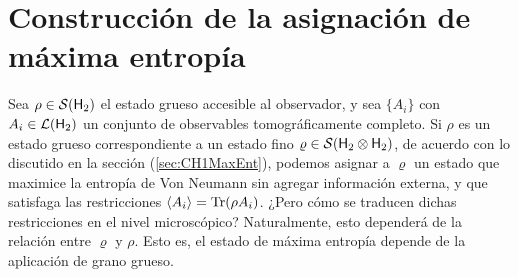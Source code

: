 \section{Construcción de la asignación de máxima entropía}

Sea $\rho\in\mathcal{S}({\sf H}_{2})$ el estado grueso accesible al observador, y sea $\{A_{i}\}$ con $A_{i}\in\mathcal{L}({\sf H}_{2})$ un conjunto de observables tomográficamente completo. Si $\rho$ es un estado grueso correspondiente a un estado fino $\varrho\in\mathcal{S}({\sf H}_{2}\otimes{\sf H}_{2})$, de acuerdo con lo discutido en la sección (\ref{sec:CH1MaxEnt}), podemos asignar a $\varrho$ un estado que maximice la entropía de Von Neumann sin agregar información externa, y que satisfaga las restricciones $\expval{A_{i}}=\Tr(\rho A_{i})$. ¿Pero cómo se traducen dichas restricciones en el nivel microscópico? Naturalmente, esto dependerá de la relación entre $\varrho$ y $\rho$. Esto es, el estado de máxima entropía depende de la aplicación de grano grueso.

